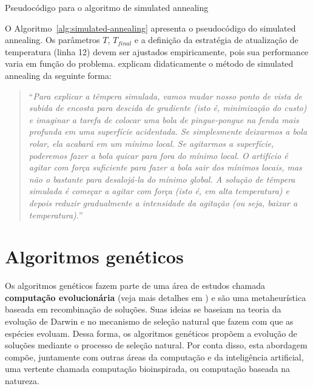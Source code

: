 \begin{algorithm}[h]
	\DontPrintSemicolon
	
	
	\caption{Pseudocódigo para o algoritmo de simulated annealing}
	\label{alg:simulated-annealing}
\end{algorithm}

O Algoritmo~\ref{alg:simulated-annealing} apresenta o pseudocódigo do simulated annealing. Os parâmetros $T$, $T_{final}$ e a definição da estratégia de atualização de temperatura (linha 12) devem ser ajustados empiricamente, pois sua performance varia em função do problema. \citet{RusselAndNorvig2010} explicam didaticamente o método de simulated annealing da seguinte forma:

\begin{quotation}
``\textit{Para explicar a têmpera simulada, vamos mudar nosso ponto de vista de subida de encosta para descida de gradiente (isto é, minimização do custo) e imaginar a tarefa de colocar uma bola de pingue-pongue na fenda mais profunda em uma superfície acidentada. Se simplesmente deixarmos a bola rolar, ela acabará em um mínimo local. Se agitarmos a superfície, poderemos fazer a bola quicar para fora do mínimo local. O artifício é agitar com força suficiente para fazer a bola sair dos mínimos locais, mas não o bastante para desalojá-la do mínimo global. A solução de têmpera simulada é começar a agitar com força (isto é, em alta temperatura) e depois reduzir gradualmente a intensidade da agitação (ou seja, baixar a temperatura).}''
\end{quotation}

\section{Algoritmos genéticos}

Os algoritmos genéticos fazem parte de uma área de estudos chamada \textbf{computação evolucionária} (veja mais detalhes em \citet{EibenAndSmith2003}) e são uma metaheurística baseada em recombinação de soluções. Suas ideias se baseiam na teoria da evolução de Darwin e no mecanismo de seleção natural que fazem com que as espécies evoluam. Dessa forma, os algoritmos genéticos propõem a evolução de soluções mediante o processo de seleção natural. Por conta disso, esta abordagem compõe, juntamente com outras áreas da computação e da inteligência artificial, uma vertente chamada computação bioinspirada, ou computação baseada na natureza.

